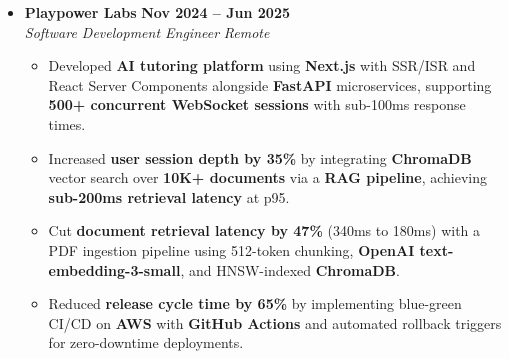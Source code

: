 \documentclass[letterpaper,10pt]{article}
\newcommand{\resumeItem}[1]{\item \small{#1}}
\newcommand{\resumeSubheading}[4]{
\item
\textbf{#1} \hfill \textbf{\small #2} \\
\textit{\small #3} \hfill \textit{\small #4}
\vspace{-4pt}
}
\begin{document}
\begin{itemize}[leftmargin=0in, label={}]
\resumeSubheading
{Playpower Labs}{Nov 2024 -- Jun 2025}
{Software Development Engineer}{Remote}
\begin{itemize}
\vspace{2pt}
  \resumeItem{Developed \textbf{AI tutoring platform} using \textbf{Next.js} with SSR/ISR and React Server Components alongside \textbf{FastAPI} microservices, supporting \textbf{500+ concurrent WebSocket sessions} with sub-100ms response times.}
  \resumeItem{Increased \textbf{user session depth by 35\%} by integrating \textbf{ChromaDB} vector search over \textbf{10K+ documents} via a \textbf{RAG pipeline}, achieving \textbf{sub-200ms retrieval latency} at p95.}
  \resumeItem{Cut \textbf{document retrieval latency by 47\%} (340ms to 180ms) with a PDF ingestion pipeline using 512-token chunking, \textbf{OpenAI text-embedding-3-small}, and HNSW-indexed \textbf{ChromaDB}.}
  \resumeItem{Reduced \textbf{release cycle time by 65\%} by implementing blue-green CI/CD on \textbf{AWS} with \textbf{GitHub Actions} and automated rollback triggers for zero-downtime deployments.}
\end{itemize}

\end{itemize}

\vspace{-12pt}
\end{document}
